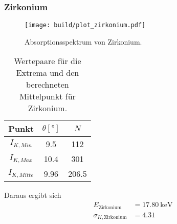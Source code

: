 \clearpage
\subsubsection*{Zirkonium}
\begin{figure}[H]
    \centering
    \texttt{[image: build/plot\_zirkonium.pdf]}
    \caption{Absorptionsspektrum von Zirkonium.}
    \label{fig:zirkonium}
\end{figure}
\begin{table}[H]                                                                                   
    \centering                                                                                     
        \caption{Wertepaare für die Extrema und den berechneten Mittelpunkt für Zirkonium.}                      
        \label{tab:Zr}                                                                        
        \begin{tabular}{S S[table-format=2.2] S}                                                   
          \toprule                                                                                 
          {Punkt} & {$\theta [\si{\degree}]$} & {$N$}\\                                            
          \midrule                                                                                 
          {$I_{K,Min  }$} &9.5&112\\
          {$I_{K,Max  }$} &10.4&301\\
          {$I_{K,Mitte}$} &9.96&206.5\\
          \bottomrule                                                                              
        \end{tabular}                                                                              
      \end{table}                                                                                  
Daraus ergibt sich                                                                                 
\begin{align*}                                                                                     
    E_\text{Zirkonium} &= \SI{17.80}{\kilo\electronvolt}\\                  
    \sigma_{K, \text{Zirkonium}} &= \num{4.31}                      
\end{align*}                                                   